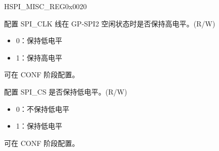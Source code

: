 \addtocounter{Regfloat}{-1}
\begin{register}{H}{SPI\_MISC\_REG}{0x0020}
\begin{regdesc}\begin{reglist}
\item [接上页]
\label{fielddesc:SPICKIDLEEDGE}\item [SPI\_CK\_IDLE\_EDGE] 配置 SPI\_CLK 线在 GP-SPI2 空闲状态时是否保持高电平。(R/W)\\
\begin{itemize}
    \item 0：保持低电平
    \item 1：保持高电平
\end{itemize}
可在 CONF 阶段配置。 
\label{fielddesc:SPICSKEEPACTIVE}\item [SPI\_CS\_KEEP\_ACTIVE] 配置 SPI\_CS 是否保持低电平。(R/W)\\
\begin{itemize}
    \item 0：不保持低电平
    \item 1：保持低电平
\end{itemize}
可在 CONF 阶段配置。 
\end{reglist}\end{regdesc}
\end{register}


